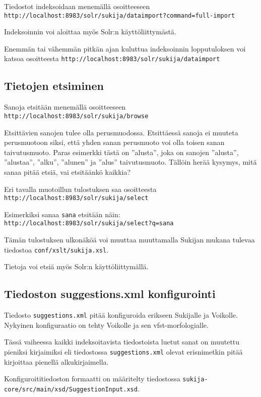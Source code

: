 \documentclass[12pt]{article}
\begin{document}
Tiedostot indeksoidaan menemällä osoitteeseen
\verb|http://localhost:8983/solr/sukija/dataimport?command=full-import|

Indeksoinnin voi aloittaa myös Solr:n käyttöliittymästä.

Enemmän tai vähemmän pitkän ajan kuluttua indeksoinnin lopputuloksen
voi katsoa osoitteesta
\verb|http://localhost:8983/solr/sukija/dataimport|


\subsection*{Tietojen etsiminen}

Sanoja etsitään menemällä osoitteeseen
\verb=http://localhost:8983/solr/sukija/browse=

Etsittävien sanojen tulee olla perusmuodossa. Etsittäessä sanoja ei
muuteta perusmuotoon siksi, että yhden sanan perusmuoto voi olla
toisen sanan taivutusmuoto. Paras esimerkki tästä on ''alusta'', joka
on sanojen ''alusta'', ''alustaa'', ''alku'', ''alunen'' ja ''alus''
taivutusmuoto. Tällöin herää kysymys, mitä sanaa pitää etsiä, vai
etsitäänkö kaikkia?

Eri tavalla muotoillun tulostuksen saa osoitteesta
\verb=http://localhost:8983/solr/sukija/select=

Esimerkiksi sanaa \verb=sana= etsitään näin:
\verb|http://localhost:8983/solr/sukija/select?q=sana|

Tämän tulostuksen ulkonäköä voi muuttaa muuttamalla Sukijan mukana
tulevaa tiedostoa \verb=conf/xslt/sukija.xsl=.

Tietoja voi etsiä myös Solr:n käyttöliittymällä.


\subsection*{Tiedoston suggestions.xml konfigurointi}


Tiedosto \verb|suggestions.xml| pitää konfiguroida erikseen
Sukijalle ja Voikolle. Nykyinen konfiguraatio on tehty Voikolle ja sen
vfst-morfologialle.

Tässä vaiheessa kaikki indeksoitavista tiedostoista luetut sanat on
muutettu pieniksi kirjaimiksi eli tiedostossa
\verb|suggestions.xml| olevat erisnimetkin pitää kirjoittaa
pienellä alkukirjaimella.

Konfiguroititiedoston formaatti on määritelty tiedostossa
\verb=sukija-core/src/main/xsd/SuggestionInput.xsd=.
\end{document}
